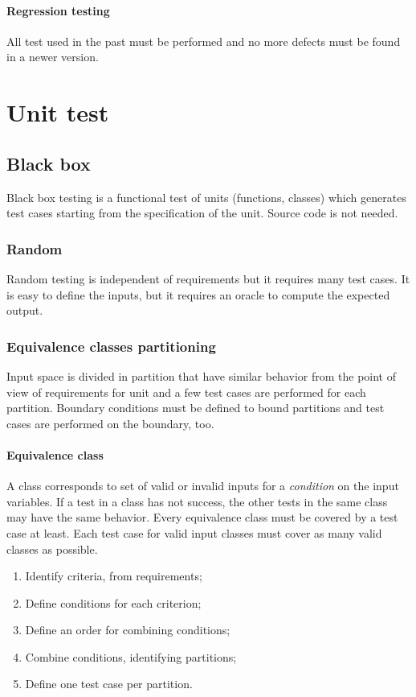 \paragraph{Regression testing}
All test used in the past must be performed and no more defects must be found in a newer version.

\section{Unit test}
\subsection{Black box}
Black box testing is a functional test of units (functions, classes) which generates test cases starting from the specification of the unit. Source code is not needed.

\subsubsection{Random}
Random testing is independent of requirements but it requires many test cases. It is easy to define the inputs, but it requires an oracle to compute the expected output.

\subsubsection{Equivalence classes partitioning}
Input space is divided in partition that have similar behavior from the point of view of requirements for unit and a few test cases are performed for each partition. Boundary conditions must be defined to bound partitions and test cases are performed on the boundary, too.

\paragraph{Equivalence class} A class corresponds to set of valid or invalid inputs for a \emph{condition} on the input variables. If a test in a class has not success, the other tests in the same class may have the same behavior. Every equivalence class must be covered by a test case at least. Each test case for valid input classes must cover as many valid classes as possible.

\begin{enumerate}
\item Identify criteria, from requirements;
\item Define conditions for each criterion;
\item Define an order for combining conditions;
\item Combine conditions, identifying partitions;
\item Define one test case per partition.
\end{enumerate}

